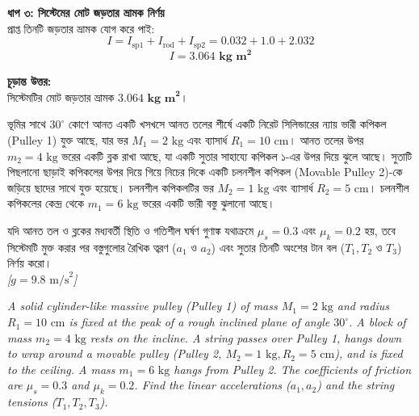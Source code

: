 \documentclass[12pt, a4paper]{article}
\begin{document}
\begin{tcolorbox}[solutionbox={সমাধান (Solution)}]
\vspace{0.5em}
\noindent
\textbf{ধাপ ৩: সিস্টেমের মোট জড়তার ভ্রামক নির্ণয়} \\
প্রাপ্ত তিনটি জড়তার ভ্রামক যোগ করে পাই:
\[ I = I_{\text{sp1}} + I_{\text{rod}} + I_{\text{sp2}} = 0.032 + 1.0 + 2.032 \]
\[ I = \mathbf{3.064\text{ kg m}^2} \]

\vspace{1em}
\begin{tcolorbox}[answerbox]
\textbf{চূড়ান্ত উত্তর:} \\
সিস্টেমটির মোট জড়তার ভ্রামক $\mathbf{3.064 \text{ kg m}^2}$।
\end{tcolorbox}
\end{tcolorbox}

\vspace{2em}

\begin{tcolorbox}[questionbox={প্রশ্ন (Question) 4}]
\noindent
ভূমির সাথে $30^\circ$ কোণে আনত একটি খসখসে আনত তলের শীর্ষে একটি নিরেট সিলিন্ডারের ন্যায় ভারী কপিকল (Pulley 1) যুক্ত আছে, যার ভর $M_1 = 2\text{ kg}$ এবং ব্যাসার্ধ $R_1 = 10\text{ cm}$। আনত তলের উপর $m_2 = 4\text{ kg}$ ভরের একটি ব্লক রাখা আছে, যা একটি সুতার সাহায্যে কপিকল ১-এর উপর দিয়ে ঝুলে আছে। সুতাটি পিছলানো ছাড়াই কপিকলের উপর দিয়ে গিয়ে নিচের দিকে একটি চলনশীল কপিকল (Movable Pulley 2)-কে জড়িয়ে ছাদের সাথে যুক্ত হয়েছে। চলনশীল কপিকলটির ভর $M_2 = 1\text{ kg}$ এবং ব্যাসার্ধ $R_2 = 5\text{ cm}$। চলনশীল কপিকলের কেন্দ্র থেকে $m_1 = 6\text{ kg}$ ভরের একটি ভারী বস্তু ঝুলানো আছে। 

\vspace{0.3em}
\noindent
যদি আনত তল ও ব্লকের মধ্যবর্তী স্থিতি ও গতিশীল ঘর্ষণ গুণাঙ্ক যথাক্রমে $\mu_s = 0.3$ এবং $\mu_k = 0.2$ হয়, তবে সিস্টেমটি মুক্ত করার পর বস্তুগুলোর রৈখিক ত্বরণ ($a_1$ ও $a_2$) এবং সুতার তিনটি অংশের টান বল ($T_1, T_2$ ও $T_3$) নির্ণয় করো। \\
\textit{[$g = 9.8\text{ m/s}^2$]}

\vspace{0.8em}
\begin{english}
\noindent\textit{\color{darkgray}
A solid cylinder-like massive pulley (Pulley 1) of mass $M_1 = 2\text{ kg}$ and radius $R_1 = 10\text{ cm}$ is fixed at the peak of a rough inclined plane of angle $30^\circ$. A block of mass $m_2 = 4\text{ kg}$ rests on the incline. A string passes over Pulley 1, hangs down to wrap around a movable pulley (Pulley 2, $M_2 = 1\text{ kg}, R_2 = 5\text{ cm}$), and is fixed to the ceiling. A mass $m_1 = 6\text{ kg}$ hangs from Pulley 2. The coefficients of friction are $\mu_s = 0.3$ and $\mu_k = 0.2$. Find the linear accelerations ($a_1, a_2$) and the string tensions ($T_1, T_2, T_3$).
}
\end{english}
\end{tcolorbox}
\end{document}
